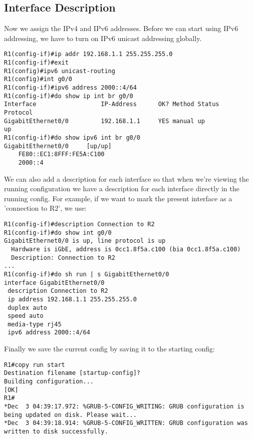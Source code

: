 \subsection{Interface Description}
Now we assign the IPv4 and IPv6 addresses. Before we can start using IPv6 addressing, we have to turn on IPv6 unicast addressing globally. 

\vspace{-15pt}
\begin{verbatim}
R1(config-if)#ip addr 192.168.1.1 255.255.255.0
R1(config-if)#exit
R1(config)#ipv6 unicast-routing
R1(config)#int g0/0
R1(config-if)#ipv6 address 2000::4/64
R1(config-if)#do show ip int br g0/0
Interface                  IP-Address      OK? Method Status                Protocol
GigabitEthernet0/0         192.168.1.1     YES manual up                    up
R1(config-if)#do show ipv6 int br g0/0
GigabitEthernet0/0     [up/up]
    FE80::EC1:8FFF:FE5A:C100
    2000::4
\end{verbatim}
\vspace{-10pt}

\noindent
We can also add a description for each interface so that when we're viewing the running configuration we have a description for each interface directly in the running config. For example, if we want to mark the present interface as a 'connection to R2', we use:

\vspace{-15pt}
\begin{verbatim}
R1(config-if)#description Connection to R2
R1(config-if)#do show int g0/0
GigabitEthernet0/0 is up, line protocol is up
  Hardware is iGbE, address is 0cc1.8f5a.c100 (bia 0cc1.8f5a.c100)
  Description: Connection to R2
...
R1(config-if)#do sh run | s GigabitEthernet0/0
interface GigabitEthernet0/0
 description Connection to R2
 ip address 192.168.1.1 255.255.255.0
 duplex auto
 speed auto
 media-type rj45
 ipv6 address 2000::4/64
\end{verbatim}
\vspace{-10pt}

\noindent
Finally we save the current config by saving it to the starting config:

\vspace{-15pt}
\begin{verbatim}
R1#copy run start
Destination filename [startup-config]?
Building configuration...
[OK]
R1#
*Dec  3 04:39:17.972: %GRUB-5-CONFIG_WRITING: GRUB configuration is being updated on disk. Please wait...
*Dec  3 04:39:18.914: %GRUB-5-CONFIG_WRITTEN: GRUB configuration was written to disk successfully.
\end{verbatim}
\vspace{-10pt}